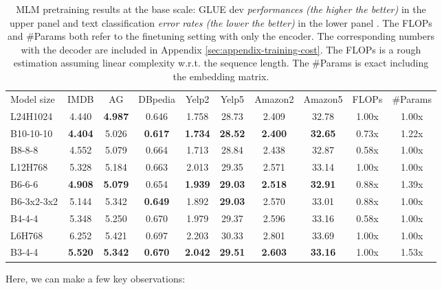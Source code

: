 \documentclass{article}
\theoremstyle{custom}
\begin{document}
\begin{table}[!ht]
\begin{tabular}{@{}lccccccccc@{}}
	\toprule
	Model size & IMDB & AG & DBpedia & Yelp2 & Yelp5 & Amazon2 & Amazon5 & FLOPs & \#Params \\
	\cmidrule(r){1-1} \cmidrule(lr){2-8} \cmidrule(l){9-10}
	{L24H1024} 
	& 4.440 & \bf 4.987 & 0.646 & 1.758 & 28.73 & 2.409 & 32.78 & {1.00x} & {1.00x} \\
	{B10-10-10} 
	& \bf 4.404 & 5.026 & \bf 0.617 & \bf 1.734 & \bf 28.52 & \bf 2.400 & \bf 32.65 & {0.73x} & {1.22x} \\
	{B8-8-8} 
	& 4.552 & 5.079 & 0.664 & 1.713 & 28.84 & 2.438 & 32.87 & {0.58x} & {1.00x} \\
	\cmidrule(r){1-1} \cmidrule(lr){2-8} \cmidrule(l){9-10}
	{L12H768} 
	& 5.328 & 5.184 & 0.663 & 2.013 & 29.35 & 2.571 & 33.14 & {1.00x} & {1.00x} \\
	{B6-6-6} 
	& \bf 4.908 & \bf 5.079 & 0.654 & \bf 1.939 & \bf 29.03 & \bf 2.518 & \bf 32.91 & {0.88x} & {1.39x} \\
	{B6-3x2-3x2} 
	& 5.144 & 5.342 & \bf 0.649 & 1.892 & \bf 29.03 & 2.570 & 33.01 & {0.88x} & {1.00x} \\
	{B4-4-4} 
	& 5.348 & 5.250 & 0.670 & 1.979 & 29.37 & 2.596 & 33.16 & {0.58x} & {1.00x} \\
	\cmidrule(r){1-1} \cmidrule(lr){2-8} \cmidrule(l){9-10}
	{L6H768} 
	& 6.252 & 5.421 & 0.697 & 2.203 & 30.33 & 2.801 & 33.69 & {1.00x} & {1.00x} \\
	{B3-4-4} 
	& \bf 5.520 & \bf 5.342 & \bf 0.670 & \bf 2.042 & \bf 29.51 & \bf 2.603 & \bf 33.16 & {1.00x} & {1.53x} \\
	\bottomrule
\end{tabular}
\caption{
	MLM pretraining results at the base scale:
	GLUE dev \textit{performances (the higher the better)} in the upper panel and text classification \textit{error rates (the lower the better)} in the lower panel . 
	The FLOPs and \#Params both refer to the finetuning setting with only the encoder. 
	The corresponding numbers with the decoder are included in Appendix \ref{sec:appendix-training-cost}. 
	The FLOPs is a rough estimation assuming linear complexity w.r.t. the sequence length.
	The \#Params is exact including the embedding matrix.}
\label{tab:fair-comparison-mlm}
\vspace{-1.5em}
\end{table}
Here, we can make a few key observations:
\end{document}
